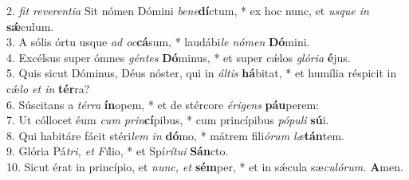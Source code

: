 2. \textit{fit reverentia} Sit nómen Dómini \textit{bene}\textbf{dí}ctum, * ex hoc nunc, et \textit{usque in} \textbf{sǽ}culum.\\
3. A sólis órtu usque \textit{ad oc}\textbf{cá}sum, * laudábi\textit{le nómen} \textbf{Dó}mini.\\
4. Excélsus super ómnes \textit{géntes} \textbf{Dó}minus, * et super cǽlos \textit{glória} \textbf{é}jus.\\
5. Quis sicut Dóminus, Déus nóster, qui in \textit{áltis} \textbf{há}bitat, * et humília réspicit in cǽ\textit{lo et in} \textbf{tér}ra?\\
6. Súscitans a \textit{térra} \textbf{ín}opem, * et de stércore \textit{érigens} \textbf{páu}perem:\\
7. Ut cóllocet éum \textit{cum prin}\textbf{cí}pibus, * cum princípibus \textit{pópuli} \textbf{sú}i.\\
8. Qui habitáre fácit stéri\textit{lem in} \textbf{dó}mo, * mátrem fili\textit{órum læ}\textbf{tán}tem.\\
9. Glória Pá\textit{tri, et} \textit{Fí}lio, * et Spí\textit{rítui} \textbf{Sán}cto.\\
10. Sicut érat in princípio, et \textit{nunc, et}\textbf{ sém}per, * et in sǽcula sæ\textit{culórum.} \textbf{A}men.
